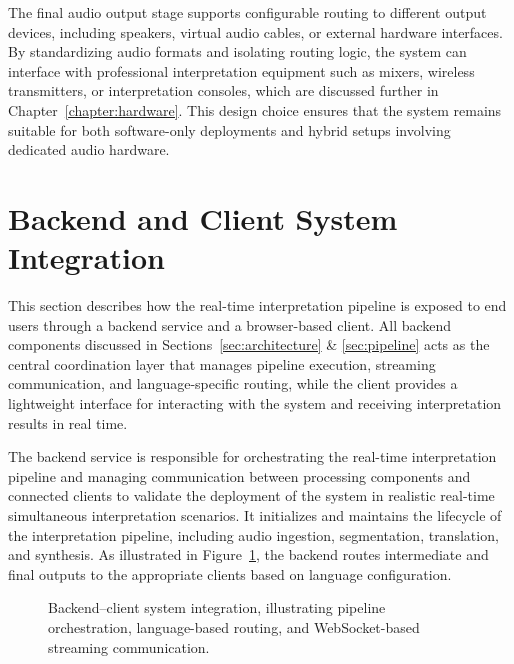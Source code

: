 The final audio output stage supports configurable routing to different output devices, including speakers, virtual audio cables, or external hardware interfaces. By standardizing audio formats and isolating routing logic, the system can interface with professional interpretation equipment such as mixers, wireless transmitters, or interpretation consoles, which are discussed further in Chapter~\ref{chapter:hardware}. This design choice ensures that the system remains suitable for both software-only deployments and hybrid setups involving dedicated audio hardware.



\section{Backend and Client System Integration}
\label{sec:backend-client}

This section describes how the real-time interpretation pipeline is exposed to end users through a backend service and a browser-based client. All backend components discussed in Sections~\ref{sec:architecture} \& \ref{sec:pipeline} acts as the central coordination layer that manages pipeline execution, streaming communication, and language-specific routing, while the client provides a lightweight interface for interacting with the system and receiving interpretation results in real time.

The backend service is responsible for orchestrating the real-time interpretation pipeline and managing communication between processing components and connected clients to validate the deployment of the system in realistic real-time simultaneous interpretation scenarios. It initializes and maintains the lifecycle of the interpretation pipeline, including audio ingestion, segmentation, translation, and synthesis. As illustrated in Figure~\ref{fig:backend-client}, the backend routes intermediate and final outputs to the appropriate clients based on language configuration.

\begin{figure}[!htbp]
  \centering
  
  \caption[Backend–client system integration]{Backend–client system integration, illustrating pipeline orchestration, language-based routing, and WebSocket-based streaming communication.}
  \label{fig:backend-client}
\end{figure}


